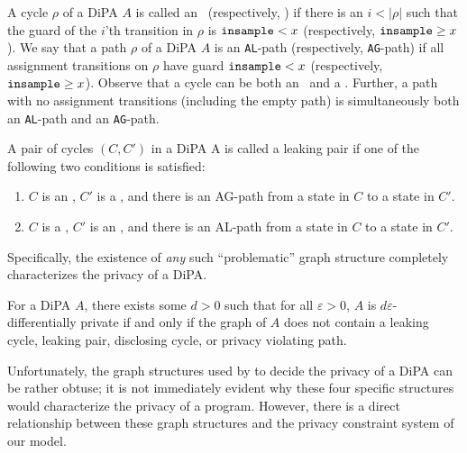 \begin{defn}
    A cycle $\rho$ of a DiPA $A$ is called an \lcycle~(respectively, \gcycle) if there is an $i< |\rho|$ such that the guard of the $i$'th transition in $\rho$ is $\texttt{insample} < x$ (respectively, $\texttt{insample}\geq x$).
    We say that a path $\rho$ of a DiPA $A$ is an \texttt{AL}-path (respectively, \texttt{AG}-path) if all assignment transitions on $\rho$ have guard $\texttt{insample} < x$ (respectively, $\texttt{insample}\geq x$).
    Observe that a cycle can be both an \lcycle~and a \gcycle.
    Further, a path with no assignment transitions (including the empty path) is simultaneously both an \texttt{AL}-path and an \texttt{AG}-path.
\end{defn} 
\begin{defn}\label{defLeakingPairs}
    A pair of cycles $(C, C')$ in a DiPA A is called a leaking pair if one of the following two conditions is satisfied:
    \begin{enumerate}
        \item $C$ is an \lcycle, $C'$ is a \gcycle, and there is an AG-path
        from a state in $C$ to a state in $C'$.
        \item $C$ is a \gcycle, $C'$ is an \lcycle, and there is an AL-path
        from a state in $C$ to a state in $C'$.
    \end{enumerate}
\end{defn} 

Specifically, the existence of \textit{any} such ``problematic'' graph structure completely characterizes the privacy of a DiPA. 

\begin{thm}\label{DiPACounterexamplesThm}
    For a DiPA $A$, there exists some $d>0$ such that for all $\varepsilon>0$, $A$ is $d\varepsilon$-differentially private if and only if the graph of $A$ does not contain a leaking cycle, leaking pair, disclosing cycle, or privacy violating path.
\end{thm}

Unfortunately, the graph structures used by \cite{chadhaLinearTimeDecidability2021} to decide the privacy of a DiPA can be rather obtuse; it is not immediately evident why these four specific structures would characterize the privacy of a program. However, there is a direct relationship between these graph structures and the privacy constraint system of our model. 

